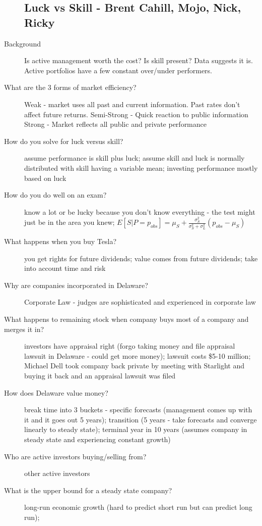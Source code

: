 \documentclass[11pt]{article}
\begin{document}
\begin{description}
\subsection{Luck vs Skill - Brent Cahill, Mojo, Nick, Ricky}
\item[Background]
  Is active management worth the cost?
  Is skill present? Data suggests it is. Active portfolios have a few constant over/under performers.
\item[What are the 3 forms of market efficiency?]
  Weak - market uses all past and current information. Past rates don't affect future returns.
  Semi-Strong - Quick reaction to public information
  Strong - Market reflects all public and private performance
\item[How do you solve for luck versus skill?]
  assume performance is skill plus luck;
  assume skill and luck is normally distributed with skill having a variable mean;
  investing performance mostly based on luck
\item[How do you do well on an exam?]
  know a lot or be lucky because you don't know everything - the test might just be in the area you knew;
  $E[S|P=p_{obs}] = \mu_S + \frac{\sigma_S^2}{\sigma_S^2 + \sigma_L^2} (p_{obs} - \mu_S)$
\item[What happens when you buy Tesla?]
  you get rights for future dividends;
  value comes from future dividends;
  take into account time and risk
\item[Why are companies incorporated in Delaware?]
  Corporate Law - judges are sophisticated and experienced in corporate law
\item[What happens to remaining stock when company buys most of a company and merges it in?]
  investors have appraisal right (forgo taking money and file appraisal lawsuit in Delaware - could get more money);
  lawsuit costs \$5-10 million;
  Michael Dell took company back private by meeting with Starlight and buying it back and an appraisal lawsuit was filed
\item[How does Delaware value money?]
  break time into 3 buckets - specific forecasts (management comes up with it and it goes out 5 years);
  transition (5 years - take forecasts and converge linearly to steady state);
  terminal year in 10 years (assumes company in steady state and experiencing constant growth)
\item[Who are active investors buying/selling from?]
  other active investors
\item[What is the upper bound for a steady state company?]
  long-run economic growth (hard to predict short run but can predict long run);

\end{description}
\end{document}
